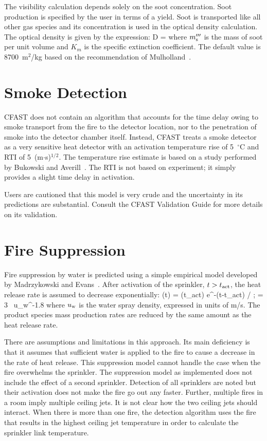 The visibility calculation depends solely on the soot concentration. Soot production is specified by the user in terms of a yield. Soot is transported like all other gas species and its concentration is used in the optical density calculation. The optical density is given by the expression:
\be
   D = 
\ee
where $m_{\rm s}'''$ is the mass of soot per unit volume and $K_m$ is the specific extinction coefficient. The default value is 8700~m$^2$/kg based on the recommendation of Mulholland~\cite{Mulholland:SFPE}.

\section{Smoke Detection}

CFAST does not contain an algorithm that accounts for the time delay owing to smoke transport from the fire to the detector location, nor to the penetration of smoke into the detector chamber itself. Instead, CFAST treats a smoke detector as a very sensitive heat detector with an activation temperature rise of 5~$^\circ$C and RTI of 5~(m$\cdot$s)$^{1/2}$. The temperature rise estimate is based on a study performed by Bukowski and Averill~\cite{Bukowski:1998}. The RTI is not based on experiment; it simply provides a slight time delay in activation.

Users are cautioned that this model is very crude and the uncertainty in its predictions are substantial. Consult the CFAST Validation Guide for more details on its validation.


\section{Fire Suppression} \label{sec:suppression}

Fire suppression by water is predicted using a simple empirical model developed by Madrzykowski \cite{Madrzykowski:1992} and Evans~\cite{Evans:1993}. After activation of the sprinkler, $t > t_{\rm act}$, the heat release rate is assumed to decrease exponentially:
\be
   \dQ(t) = \dQ(t_{\rm act}) \; {\rm e}^{-(t-t_{\rm act}) /\tau}   \quad ; \quad \tau = 3 \, u_{\rm w}^{-1.8}
\ee
where $u_{\rm w}$ is the water spray density, expressed in units of m/s. The product species mass production rates are reduced by the same amount as the heat release rate.

There are assumptions and limitations in this approach. Its main deficiency is that it assumes that sufficient water is applied to the fire to cause a decrease in the rate of heat release. This suppression model cannot handle the case when the fire overwhelms the sprinkler.  The suppression model as implemented does not include the effect of a second sprinkler. Detection of all sprinklers are noted but their activation does not make the fire go out any faster. Further, multiple fires in a room imply multiple ceiling jets. It is not clear how the two ceiling jets should interact. When there is more than one fire, the detection algorithm uses the fire that results in the highest ceiling jet temperature in order to calculate the sprinkler link temperature.


